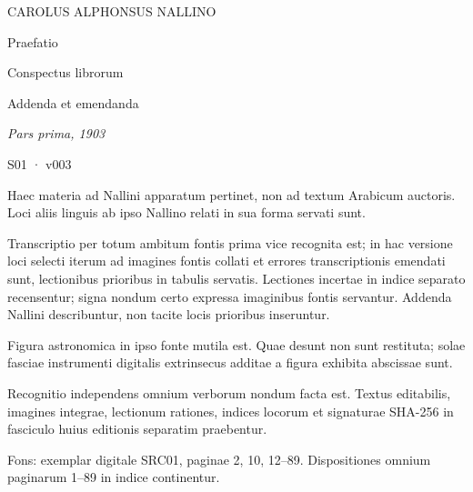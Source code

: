 \documentclass[11pt]{article}
\begin{document}
\hypertarget{S01-v003-EDITORIAL-NOTICE}{}
\vspace*{25mm}
\begin{center}
{\fontsize{11}{15}\selectfont{} CAROLUS ALPHONSUS NALLINO\par}
\vspace{12mm}
{\fontsize{25}{34}\selectfont Praefatio\par Conspectus librorum\par Addenda et emendanda\par}
\vspace{10mm}
{\fontsize{12}{17}\selectfont\itshape Pars prima, 1903\par}
\vspace{18mm}
{\fontsize{10}{14}\selectfont S01 · v003\par}
\end{center}
\vspace{12mm}
\fontsize{11}{16}\selectfont
Haec materia ad Nallini apparatum pertinet, non ad textum Arabicum auctoris.
Loci aliis linguis ab ipso Nallino relati in sua forma servati sunt.\par\medskip
Transcriptio per totum ambitum fontis prima vice recognita est; in hac
versione loci selecti iterum ad imagines fontis collati et errores transcriptionis
emendati sunt, lectionibus prioribus in tabulis servatis.
Lectiones incertae in indice separato recensentur; signa nondum certo expressa
imaginibus fontis servantur. Addenda Nallini describuntur, non tacite locis prioribus inseruntur.\par\medskip
Figura astronomica in ipso fonte mutila est. Quae desunt non sunt restituta;
solae fasciae instrumenti digitalis extrinsecus additae a figura exhibita abscissae sunt.\par\medskip
Recognitio independens omnium verborum nondum facta est.
Textus editabilis, imagines integrae, lectionum rationes, indices locorum et
signaturae SHA-256 in fasciculo huius editionis separatim praebentur.\par\medskip
Fons: exemplar digitale SRC01, paginae 2, 10, 12–89.
Dispositiones omnium paginarum 1–89 in indice continentur.
\end{document}
